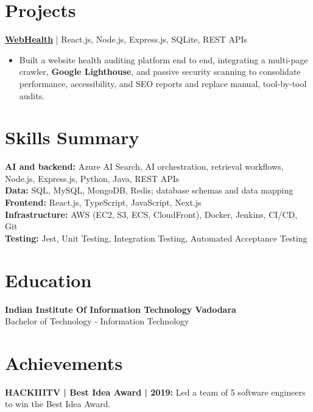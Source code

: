 \documentclass[a4paper,10pt]{article}
\begin{document}
\section{Projects}
\textbf{\href{https://web-health-eta.vercel.app/}{WebHealth}} | React.js, Node.js, Express.js, SQLite, REST APIs
\begin{itemize}
\item Built a website health auditing platform end to end, integrating a multi-page crawler, \textbf{Google Lighthouse}, and passive security scanning to consolidate performance, accessibility, and SEO reports and replace manual, tool-by-tool audits.
\end{itemize}

\section{Skills Summary}
\textbf{AI and backend:} Azure AI Search, AI orchestration, retrieval workflows, Node.js, Express.js, Python, Java, REST APIs\\
\textbf{Data:} SQL, MySQL, MongoDB, Redis; database schemas and data mapping\\
\textbf{Frontend:} React.js, TypeScript, JavaScript, Next.js\\
\textbf{Infrastructure:} AWS (EC2, S3, ECS, CloudFront), Docker, Jenkins, CI/CD, Git\\
\textbf{Testing:} Jest, Unit Testing, Integration Testing, Automated Acceptance Testing

\section{Education}
\textbf{Indian Institute Of Information Technology Vadodara}\\
Bachelor of Technology - Information Technology

\section{Achievements}
\textbf{HACKIIITV | Best Idea Award | 2019:} Led a team of 5 software engineers to win the Best Idea Award.
\end{document}
